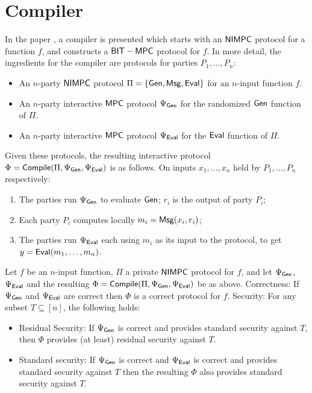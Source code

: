 \section{Compiler}
In the paper \cite{BITMPC}, a compiler is presented which starts with an $\mathsf{NIMPC}$ protocol for a function $f$, and constructs a $\mathsf{BIT-MPC}$ protocol for $f$. In more detail, the ingredients for the compiler are protocols for parties $P_1,\ldots, P_n$: 
\begin{itemize}
\item An $n$-party $\mathsf{NIMPC}$ protocol $\Pi=\{\mathsf{Gen},\mathsf{Msg},\mathsf{Eval}\}$ for an $n$-input function $f$.
\item An $n$-party interactive $\mathsf{MPC}$ protocol $\Psi_{\mathsf{Gen}}$ for the randomized $\mathsf{Gen}$ function of $\Pi$.
\item An $n$-party interactive $\mathsf{MPC}$ protocol $\Psi_{\mathsf{Eval}}$ for the $\mathsf{Eval}$ function of $\Pi$.
\end{itemize}
Given these protocols, the resulting interactive protocol $\Phi = \mathsf{Compile}(\Pi, \Psi_{\mathsf{Gen}},\Psi_{\mathsf{Eval}})$ is as follows. On inputs $x_1,\ldots, x_n$ held by $P_1,\ldots, P_n$ respectively:
\begin{enumerate}
\item The parties run $\Psi_{\mathsf{Gen}}$ to evaluate $\mathsf{Gen}$; $r_i$ is the output of party $P_i$;
\item Each party $P_i$ computes locally $m_i=\mathsf{Msg}(x_i,r_i)$;
\item The parties run $\Psi_{\mathsf{Eval}}$ each using $m_i$ as its input to the protocol, to get $y=\mathsf{Eval}(m_1,\ldots,m_n)$.
\end{enumerate}
\begin{theorem}
	Let $f$ be an $n$-input function, $\Pi$ a private $\mathsf{NIMPC}$ protocol for $f$, and let $\Psi_{\mathsf{Gen}}$, $\Psi_{\mathsf{Eval}}$ and the resulting $\Phi=\mathsf{Compile}(\Pi, \Psi_{\mathsf{Gen}}, \Psi_{\mathsf{Eval}})$ be as above.
	Correctness: If $\Psi_{\mathsf{Gen}}$  and $\Psi_{\mathsf{Eval}}$ are correct then $\Phi$ is a correct protocol for $f$.
	Security: For any subset $T\subseteq [n]$, the following holds:
	\begin{itemize}
	\item Residual Security: If $\Psi_{\mathsf{Gen}}$ is correct and provides standard security against $T$, then $\Phi$ provides (at least) residual security against $T$.
	\item Standard security: If $\Psi_{\mathsf{Gen}}$ is correct and $\Psi_{\mathsf{Eval}}$ is correct and provides standard security against $T$ then the resulting $\Phi$ also provides standard security against $T$. 
	\end{itemize}
\end{theorem}

